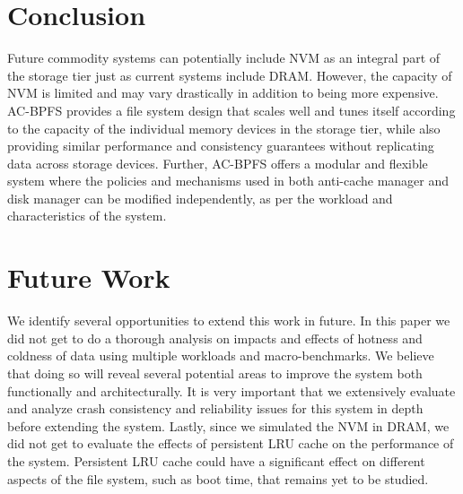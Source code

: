 \section{Conclusion}
\label{sec-conc}

Future commodity systems can potentially include NVM as an integral part of the storage tier just as current systems include DRAM. However, the capacity of NVM is limited and may vary drastically in addition to being more expensive. AC-BPFS provides a file system design that scales well and tunes itself according to the capacity of the individual memory devices in the storage tier, while also providing similar performance and consistency guarantees without replicating data across storage devices. Further, AC-BPFS offers a modular and flexible system where the policies and mechanisms used in both anti-cache manager and disk manager can be modified independently, as per the workload and characteristics of the system.

\section{Future Work}
\label{sec-conc}

We identify several opportunities to extend this work in future. In this paper we did not get to do a thorough analysis on impacts and effects of hotness and coldness of data using multiple workloads and macro-benchmarks. We believe that doing so will reveal several potential areas to improve the system both functionally and architecturally. It is very important that we extensively evaluate and analyze crash consistency and reliability issues for this system in depth before extending the system. Lastly, since we simulated the NVM in DRAM, we did not get to evaluate the effects of persistent LRU cache on the performance of the system. Persistent LRU cache could have a significant effect on different aspects of the file system, such as boot time, that remains yet to be studied.
